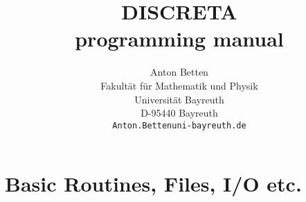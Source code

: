 \documentclass[10pt,a4paper]{book}
\begin{document}
 

{\allowdisplaybreaks%



%

\renewcommand{\labelenumi}{(\roman{enumi})}

\title{\vspace*{-15mm}
DISCRETA\\
programming manual\\
}
\author{
Anton Betten \\
Fakult\"at f\"ur Mathematik und Physik\\
Universit\"at Bayreuth\\ 
D-95440 Bayreuth\\
{\tt Anton.Bettenuni-bayreuth.de} 
}%



\maketitle

\thispagestyle{empty}\phantom{Seite2}\clearpage%

\tableofcontents




\chapter{Basic Routines, Files, I/O etc.}








}
\end{document}
